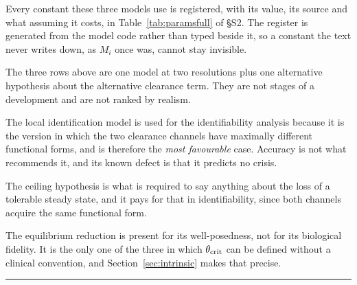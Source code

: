 Every constant these three models use is registered, with its value, its source and
what assuming it costs, in Table~\ref{tab:paramsfull} of \S S2. The register is generated
from the model code rather than typed beside it, so a constant the text never writes down,
as $M_i$ once was, cannot stay invisible.

\begin{remark}
The three rows above are one model at two resolutions plus one alternative hypothesis about
the alternative clearance term. They are not stages of a development and are not ranked by
realism.

The local identification model is used for the identifiability analysis because it is the
version in which the
two clearance channels have maximally different functional forms, and is therefore the
\emph{most favourable} case. Accuracy is not what recommends it, and its known defect is
that it predicts no crisis.

The ceiling hypothesis is what is required to say anything about the loss of a tolerable
steady state,
and it pays for that in identifiability, since both channels acquire the same functional
form.

The equilibrium reduction is present for its well-posedness, not for its biological
fidelity. It is
the only one of the three in which $\theta_{\mathrm{crit}}$ can be defined without a clinical convention,
and Section~\ref{sec:intrinsic} makes that precise.
\end{remark}

\vspace{0.5em}
\hrule
\vspace{1em}

